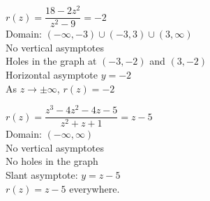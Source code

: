 \begin{exenum}
\item $r(z) = \dfrac{18-2z^2}{z^2-9} = -2$\\
Domain: $(-\infty, -3) \cup (-3,3) \cup (3, \infty)$\\
No vertical asymptotes \\
Holes in the graph at $(-3,-2)$ and $(3,-2)$ \\
Horizontal asymptote $y = -2$ \\
As $z \rightarrow \pm \infty$, $r(z) = -2$ \\

\item $r(z) = \dfrac{z^3-4z^2-4z-5}{z^2+z+1} = z-5$\\
Domain: $(-\infty, \infty)$\\
No vertical asymptotes \\
No holes in the graph \\
Slant asymptote:  $y = z-5$ \\
$r(z) = z-5$ everywhere. \\

\end{exenum}

